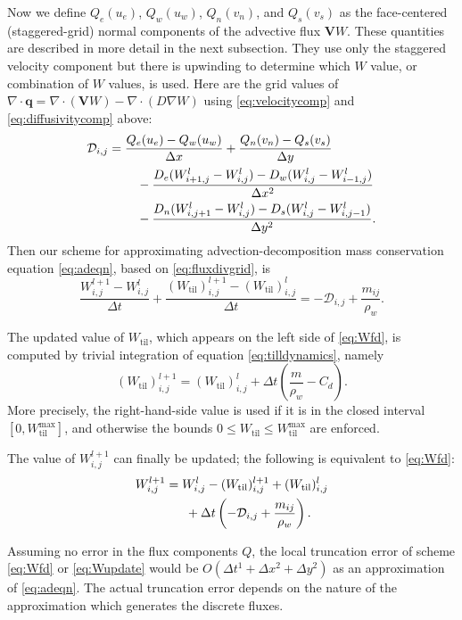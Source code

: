 \documentclass[gmd]{copernicus}   %
\newcommand{\text}{\textrm}
\newcommand\bV{\mathbf{V}}
\newcommand\bq{\mathbf{q}}
\newcommand{\Div}{\nabla\cdot}
\newcommand{\grad}{\nabla}
\newcommand{\Wtil}{W_{\text{til}}}
\newcommand{\Wtilmax}{W_{\text{til}}^{\text{max}}}
\newcommand{\Wlij}{W^l_{i,j}}
\begin{document}
Now we define $Q_e(u_e)$, $Q_w(u_w)$, $Q_n(v_n)$, and $Q_s(v_s)$ as the face-centered (staggered-grid) normal components of the advective flux $\bV W$.  These quantities are described in more detail in the next subsection.  They use only the staggered velocity component but there is upwinding to determine which $W$ value, or combination of $W$ values, is used.  Here are the grid values of $\Div \bq = \Div (\bV W) - \Div (D \grad W)$ using \eqref{eq:velocitycomp} and \eqref{eq:diffusivitycomp} above:
\begin{align}
&\mathcal{D}_{i,j} =  \frac{Q_e(u_e) - Q_w(u_w)}{\Delta x} + \frac{Q_n(v_n) - Q_s(v_s)}{\Delta y}  \label{eq:fluxdivgrid} \\
&\qquad \qquad - \frac{D_e (W_{i+1,j}^l - \Wlij) - D_w (\Wlij - W_{i-1,j}^l)}{\Delta x^2} \notag \\
&\qquad \qquad - \frac{D_n (W_{i,j+1}^l - \Wlij) - D_s (\Wlij - W_{i,j-1}^l)}{\Delta y^2}.  \notag
\end{align}
Then our scheme for approximating advection-decomposition mass conservation equation \eqref{eq:adeqn}, based on \eqref{eq:fluxdivgrid}, is
\begin{equation}
\frac{W_{i,j}^{l+1} - W_{i,j}^l}{\Delta t} + \frac{(\Wtil)_{i,j}^{l+1} - (\Wtil)_{i,j}^l}{\Delta t} = - \mathcal{D}_{i,j} + \frac{m_{ij}}{\rho_w}.    \label{eq:Wfd}
\end{equation}

The updated value of $\Wtil$, which appears on the left side of \eqref{eq:Wfd}, is computed by trivial integration of equation \eqref{eq:tilldynamics}, namely
\begin{equation}
(\Wtil)_{i,j}^{l+1} = (\Wtil)_{i,j}^l + \Delta t \left(\frac{m}{\rho_w} - C_d\right).  \label{eq:tillupdatefd}
\end{equation}
More precisely, the right-hand-side value is used if it is in the closed interval $[0,\Wtilmax]$, and otherwise the bounds $0\le \Wtil \le \Wtilmax$ are enforced.

The value of $W_{i,j}^{l+1}$ can finally be updated; the following is equivalent to \eqref{eq:Wfd}:
\begin{align}
&W_{i,j}^{l+1} = W_{i,j}^l - (\Wtil)_{i,j}^{l+1} + (\Wtil)_{i,j}^l \label{eq:Wupdate} \\ 
&\qquad \qquad + \Delta t \left(-\mathcal{D}_{i,j} +  \frac{m_{ij}}{\rho_w}\right). \notag
\end{align}

Assuming no error in the flux components $Q$, the local truncation error \citep{MortonMayers} of scheme \eqref{eq:Wfd} or \eqref{eq:Wupdate} would be $O(\Delta t^1 + \Delta x^2 + \Delta y^2)$ as an approximation of \eqref{eq:adeqn}.  The actual truncation error depends on the nature of the approximation which generates the discrete fluxes.
\end{document}
